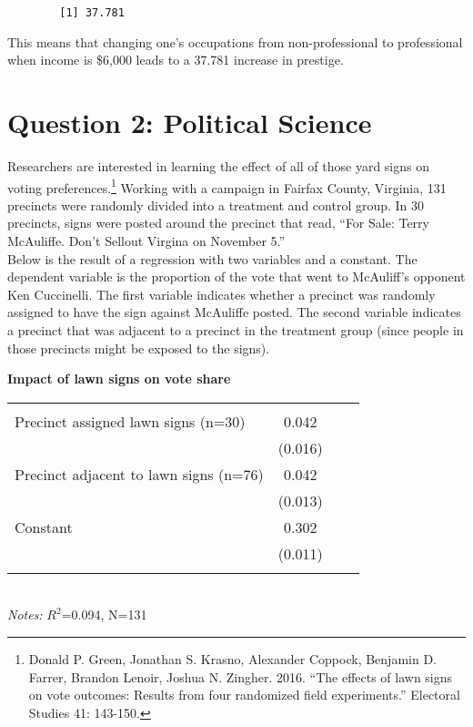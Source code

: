 \documentclass[12pt,letterpaper]{article}
\begin{document}
\begin{enumerate}
		
	\vspace{.1cm}
	
	\begin{verbatim}
		[1] 37.781
	\end{verbatim}

\noindent This means that changing one's occupations from non-professional to professional when income is \$6,000 leads to a 37.781 increase in prestige.
	
\end{enumerate}

\newpage

\section*{Question 2: Political Science}
\vspace{.25cm}
\noindent 	Researchers are interested in learning the effect of all of those yard signs on voting preferences.\footnote{Donald P. Green, Jonathan	S. Krasno, Alexander Coppock, Benjamin D. Farrer,	Brandon Lenoir, Joshua N. Zingher. 2016. ``The effects of lawn signs on vote outcomes: Results from four randomized field experiments.'' Electoral Studies 41: 143-150. } Working with a campaign in Fairfax County, Virginia, 131 precincts were randomly divided into a treatment and control group. In 30 precincts, signs were posted around the precinct that read, ``For Sale: Terry McAuliffe. Don't Sellout Virgina on November 5.'' \\

Below is the result of a regression with two variables and a constant.  The dependent variable is the proportion of the vote that went to McAuliff's opponent Ken Cuccinelli. The first variable indicates whether a precinct was randomly assigned to have the sign against McAuliffe posted. The second variable indicates
a precinct that was adjacent to a precinct in the treatment group (since people in those precincts might be exposed to the signs).  \\

\vspace{.5cm}
\begin{table}[!htbp]
	\centering 
	\textbf{Impact of lawn signs on vote share}\\
	\begin{tabular}{@{\extracolsep{5pt}}lccc} 
		\\[-1.8ex] 
		\hline \\[-1.8ex]
		Precinct assigned lawn signs  (n=30)  & 0.042\\
		& (0.016) \\
		Precinct adjacent to lawn signs (n=76) & 0.042 \\
		&  (0.013) \\
		Constant  & 0.302\\
		& (0.011)
		\\
		\hline \\
	\end{tabular}\\
	\footnotesize{\textit{Notes:} $R^2$=0.094, N=131}
\end{table}
\end{document}
